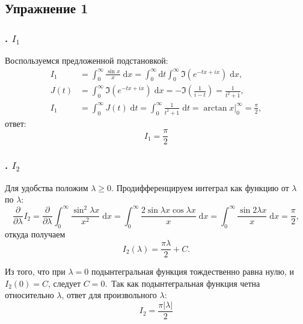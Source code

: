 \def \picdir{pic/}

\subsection*{Упражнение 1}
\subsubsection*{. $I_1$}
Воспользуемся предложенной подстановкой:
\begin{align*}
  I_1 &= \int_{0}^{\infty} \frac{\sin{x}}{x}\; \mathrm{d} x = \int_{0}^{\infty} \mathrm{d} t \int_{0}^{\infty} \Im{\left(e^{-tx + ix}\right)}\; \mathrm{d} x,\\
  J(t) &= \int_{0}^{\infty} \Im{\left(e^{-tx + ix}\right)}\; \mathrm{d} x = - \Im \left(\frac{1}{i-t}\right) = \frac{1}{t^2 + 1},\\
  I_1 &= \int_{0}^{\infty} J(t)\; \mathrm{d} t = \int_{0}^{\infty} \frac{1}{t^2 + 1}\; \mathrm{d} t = \left.\arctan{x}\right|_{0}^{\infty} = \frac{\pi}{2},
\end{align*}
ответ:
\begin{equation*}
  \boxed{I_1 = \frac{\pi}{2}}
\end{equation*}
\subsubsection*{. $I_2$}
Для удобства положим $\lambda \ge 0$. Продифференцируем интеграл как функцию от $\lambda$ по $\lambda$:
\begin{equation*}
  \frac{\partial^{} }{\partial \lambda^{}} I_2 = \frac{\partial^{} }{\partial \lambda^{}} \int_{0}^{\infty} \frac{\sin^2{\lambda x}}{x^2}\; \mathrm{d} x = \int_{0}^{\infty} \frac{2\sin{\lambda x}\cos{\lambda x}}{x}\; \mathrm{d} x = \int_{0}^{\infty} \frac{\sin{2\lambda x}}{x}\; \mathrm{d} x = \frac{\pi}{2},
\end{equation*}
откуда получаем
\begin{equation*}
  I_2(\lambda) = \frac{\pi \lambda}{2} + C.
\end{equation*}

Из того, что при $\lambda = 0$ подынтегральная функция тождественно равна нулю, и $I_2(0) = C$, следует $C = 0$.\
Так как подынтегральная функция четна относительно $\lambda$, ответ для произвольного $\lambda$:
\begin{equation*}
  \boxed{I_2 = \frac{\pi |\lambda|}{2}}
\end{equation*}